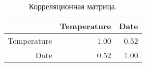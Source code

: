 \begin{table}[ht]
\centering
\begin{tabular}{rrr}
  \hline
 & Temperature & Date \\ 
  \hline
Temperature & 1.00 & 0.52 \\ 
  Date & 0.52 & 1.00 \\ 
   \hline
\end{tabular}
\caption{Корреляционная матрица.} 
\label{table:cmatrix}
\end{table}
